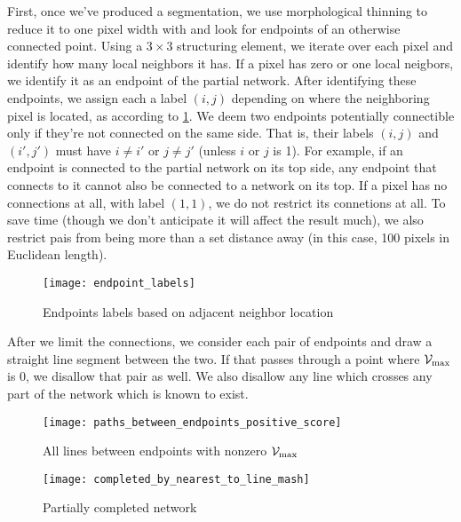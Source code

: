 First, once we've produced a segmentation, we use morphological thinning to reduce it to one pixel width with \cite{thinning} and look for endpoints of an otherwise connected point. Using a $3\times 3$ structuring element, we iterate over each pixel and identify how many local neighbors it has. If a pixel has zero or one local neigbors, we identify it as an endpoint of the partial network. After identifying these endpoints, we assign each a label $(i,j)$ depending on where the neighboring pixel is located, as according to \cref{fig:endpoint_labels}. We deem two endpoints potentially connectible only if they're not connected on the same side. That is, their labels $(i,j)$ and $(i',j')$ must have $i\ne i'$ or $j\ne j'$ (unless $i$ or $j$ is 1). For example, if an endpoint is connected to the partial network on its top side, any endpoint that connects to it cannot also be connected to a network on its top. If a pixel has no connections at all, with label $(1,1)$, we do not restrict its connetions at all. To save time (though we don't anticipate it will affect the result much), we also restrict pais from being more than a set distance away (in this case, 100 pixels in Euclidean length).

\begin{figure}
	\centering
	\texttt{[image: endpoint\_labels]}
	\caption{Endpoints labels based on adjacent neighbor location}
	\label{fig:endpoint_labels}
\end{figure}

After we limit the connections, we consider each pair of endpoints and draw a straight line segment between the two. If that passes through a point where $\mathcal{V}_{\max}$ is 0, we disallow that pair as well. We also disallow any line which crosses any part of the network which is known to exist.
\begin{figure}[p]
	\texttt{[image: paths\_between\_endpoints\_positive\_score]}
	\caption{All lines between endpoints with nonzero $\mathcal{V}_{\max}$}
	\label{fig:network-completion-connected-pairs}
\end{figure}
\begin{figure}[p] \centering
	\texttt{[image: completed\_by\_nearest\_to\_line\_mash]}
	\caption{Partially completed network}
	\label{fig:network-completion-end-result}
\end{figure}

